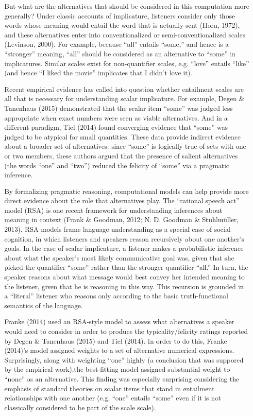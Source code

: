 \documentclass[10pt, letterpaper]{article}
\begin{document}
But what are the alternatives that should be considered in this
computation more generally? Under classic accounts of implicature,
listeners consider only those words whose meaning would entail the word
that is actually sent (Horn, 1972), and these alternatives enter into
conventionalized or semi-conventionalized scales (Levinson, 2000). For
example, because ``all'' entails ``some,'' and hence is a ``stronger''
meaning, ``all'' should be considered as an alternative to ``some'' in
implicatures. Similar scales exist for non-quantifier scales, e.g.
``love'' entails ``like'' (and hence ``I liked the movie'' implicates
that I didn't love it).

Recent empirical evidence has called into question whether entailment
scales are all that is necessary for understanding scalar implicature.
For example, Degen \& Tanenhaus (2015) demonstrated that the scalar item
``some'' was judged less appropriate when exact numbers were seen as
viable alternatives. And in a different paradigm, Tiel (2014) found
converging evidence that ``some'' was judged to be atypical for small
quantities. These data provide indirect evidence about a broader set of
alternatives: since ``some'' is logically true of sets with one or two
members, these authors argued that the presence of salient alternatives
(the words ``one'' and ``two'') reduced the felicity of ``some'' via a
pragmatic inference.

By formalizing pragmatic reasoning, computational models can help
provide more direct evidence about the role that alternatives play. The
``rational speech act'' model (RSA) is one recent framework for
understanding inferences about meaning in context (Frank \& Goodman,
2012; N. D. Goodman \& Stuhlm{ü}ller, 2013). RSA models frame language
understanding as a special case of social cognition, in which listeners
and speakers reason recursively about one another's goals. In the case
of scalar implicature, a listener makes a probabilistic inference about
what the speaker's most likely communicative goal was, given that she
picked the quantifier ``some'' rather than the stronger quantifier
``all.'' In turn, the speaker reasons about what message would best
convey her intended meaning to the listener, given that he is reasoning
in this way. This recursion is grounded in a ``literal'' listener who
reasons only according to the basic truth-functional semantics of the
language.

Franke (2014) used an RSA-style model to assess what alternatives a
speaker would need to consider in order to produce the
typicality/felicity ratings reported by Degen \& Tanenhaus (2015) and
Tiel (2014). In order to do this, Franke (2014)'s model assigned weights
to a set of alternative numerical expressions. Surprisingly, along with
weighting ``one'' highly (a conclusion that was suppored by the
empirical work),the best-fitting model assigned substantial weight to
``none'' as an alternative. This finding was especially surprising
considering the emphasis of standard theories on scalar items that stand
in entailment relationships with one another (e.g. ``one'' entails
``some'' even if it is not classically considered to be part of the
scale scale).
\end{document}
